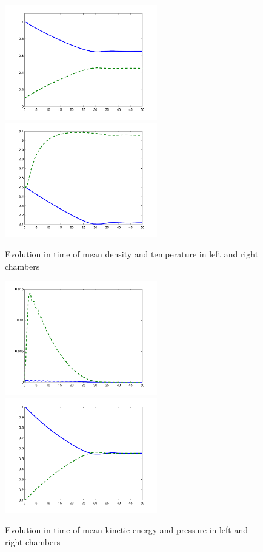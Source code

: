 \begin{figure}[bhpt]
\centerline{
\includegraphics[height=5.0cm]
{chapters/hoffman-3/pdf/Rho_2.pdf}
\includegraphics[height=5.0cm]
{chapters/hoffman-3/pdf/T_2.pdf}
}
\caption{Evolution in time of mean density and temperature in left and right
chambers}
\label{densitytemp}
\end{figure}
\begin{figure}[bhpt]
\centerline{
\includegraphics[height=5.0cm]
{chapters/hoffman-3/pdf/K_2.pdf}
\includegraphics[height=5.0cm]
{chapters/hoffman-3/pdf/P_2.pdf}
}
\caption{Evolution in time of mean kinetic energy and pressure in left and right
chambers}
\label{kinenergypress}
\end{figure}

